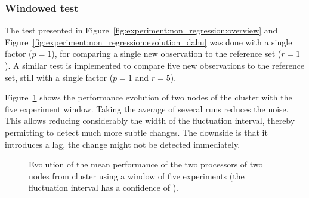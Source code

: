             \subsubsection{Windowed test}%

                The test presented in Figure~\ref{fig:experiment:non_regression:overview} and
                Figure~\ref{fig:experiment:non_regression:evolution_dahu} was done with a single factor (\(p=1\)), for
                comparing a single new observation to the reference set (\(r=1\)). A similar test is implemented to
                compare five new observations to the reference set, still with a single factor (\(p=1\) and \(r=5\)).

                Figure~\ref{fig:experiment:non_regression:evolution_dahu_windowed} shows the performance evolution of
                two nodes of the cluster \dahu with the five experiment window. Taking the average of several runs
                reduces the noise. This allows reducing considerably the width of the fluctuation interval, thereby
                permitting to detect much more subtle changes. The downside is that it introduces a lag, the change
                might not be detected immediately.

                \begin{figure}[htpb]
                    \centering
                    \caption{Evolution of the mean performance of the two processors of two nodes from cluster
                    \dahu using a window of five experiments (the fluctuation interval has a confidence of
                    ).}%
                    \label{fig:experiment:non_regression:evolution_dahu_windowed}
                \end{figure}

